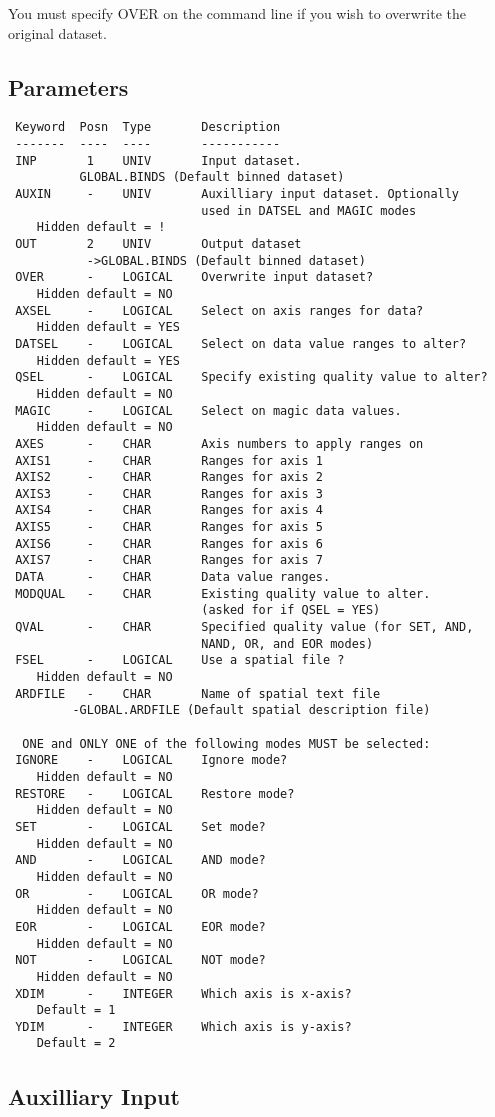 \documentclass{book}
\renewcommand{\_}{{\tt\char'137}}     %
\begin{document}
You must specify OVER on the command line if you wish to
overwrite the original dataset.

\subsection{Parameters}
\begin{verbatim}
 Keyword  Posn  Type       Description
 -------  ----  ----       -----------
 INP       1    UNIV       Input dataset.
          GLOBAL.BINDS (Default binned dataset)
 AUXIN     -    UNIV       Auxilliary input dataset. Optionally
                           used in DATSEL and MAGIC modes
    Hidden default = !
 OUT       2    UNIV       Output dataset
           ->GLOBAL.BINDS (Default binned dataset)
 OVER      -    LOGICAL    Overwrite input dataset?
    Hidden default = NO
 AXSEL     -    LOGICAL    Select on axis ranges for data?
    Hidden default = YES
 DATSEL    -    LOGICAL    Select on data value ranges to alter?
    Hidden default = YES
 QSEL      -    LOGICAL    Specify existing quality value to alter?
    Hidden default = NO
 MAGIC     -    LOGICAL    Select on magic data values.
    Hidden default = NO
 AXES      -    CHAR       Axis numbers to apply ranges on
 AXIS1     -    CHAR       Ranges for axis 1
 AXIS2     -    CHAR       Ranges for axis 2
 AXIS3     -    CHAR       Ranges for axis 3
 AXIS4     -    CHAR       Ranges for axis 4
 AXIS5     -    CHAR       Ranges for axis 5
 AXIS6     -    CHAR       Ranges for axis 6
 AXIS7     -    CHAR       Ranges for axis 7
 DATA      -    CHAR       Data value ranges.
 MODQUAL   -    CHAR       Existing quality value to alter.
                           (asked for if QSEL = YES)
 QVAL      -    CHAR       Specified quality value (for SET, AND,
                           NAND, OR, and EOR modes)
 FSEL      -    LOGICAL    Use a spatial file ?
    Hidden default = NO
 ARDFILE   -    CHAR       Name of spatial text file
         -GLOBAL.ARDFILE (Default spatial description file)

  ONE and ONLY ONE of the following modes MUST be selected:
 IGNORE    -    LOGICAL    Ignore mode?
    Hidden default = NO
 RESTORE   -    LOGICAL    Restore mode?
    Hidden default = NO
 SET       -    LOGICAL    Set mode?
    Hidden default = NO
 AND       -    LOGICAL    AND mode?
    Hidden default = NO
 OR        -    LOGICAL    OR mode?
    Hidden default = NO
 EOR       -    LOGICAL    EOR mode?
    Hidden default = NO
 NOT       -    LOGICAL    NOT mode?
    Hidden default = NO
 XDIM      -    INTEGER    Which axis is x-axis?
    Default = 1
 YDIM      -    INTEGER    Which axis is y-axis?
    Default = 2

\end{verbatim}\subsection{Auxilliary Input}
\end{document}
